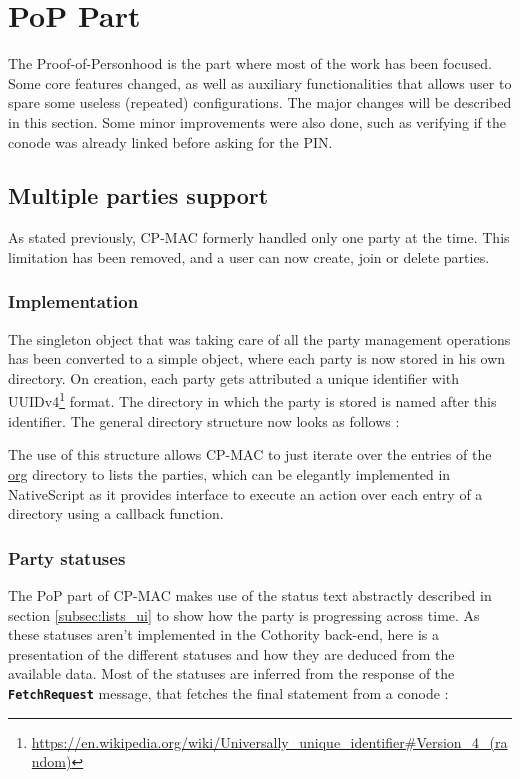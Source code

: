 \section{PoP Part}
\label{sec:pop_part}
The Proof-of-Personhood is the part where most of the work has been focused. Some core features changed, as well as auxiliary functionalities that allows user to spare some useless (repeated) configurations. The major changes will be described in this section. Some minor improvements were also done, such as verifying if the conode was already linked before asking for the PIN.
\subsection{Multiple parties support}
\label{subsec:pop_mult_parties}
As stated previously, CP-MAC formerly handled only one party at the time. This limitation has been removed, and a user can now create, join or delete parties. 
\subsubsection{Implementation}
The singleton object that was taking care of all the party management operations has been converted to a simple object, where each party is now stored in his own directory. On creation, each party gets attributed a unique identifier with UUIDv4\footnote{\url{https://en.wikipedia.org/wiki/Universally_unique_identifier#Version_4_(random)}} format. The directory in which the party is stored is named after this identifier. The general directory structure now looks as follows :

\begin{center}
\begin{minipage}[c]{0.5\textwidth}
\end{minipage}
\end{center}

The use of this structure allows CP-MAC to just iterate over the entries of the \url{org} directory to lists the parties, which can be elegantly implemented in NativeScript as it provides interface to execute an action over each entry of a directory using a callback function. 

\subsubsection{Party statuses}
The PoP part of CP-MAC makes use of the status text abstractly described in section \ref{subsec:lists_ui} to show how the party is progressing across time. As these statuses aren't implemented in the Cothority back-end, here is a presentation of the different statuses and how they are deduced from the available data. Most of the statuses are inferred from the response of the \texttt{\textbf{FetchRequest}} message, that fetches the final statement from a conode :

